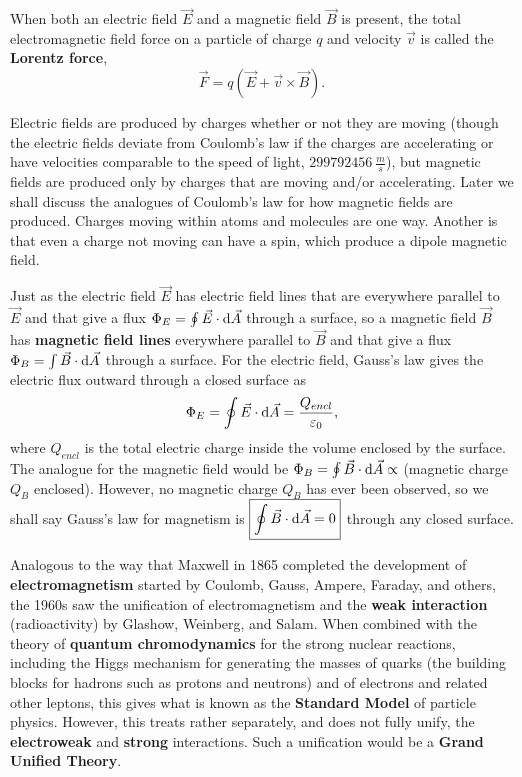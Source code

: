 When both an electric field $\vec{E}$ and a magnetic field $\vec{B}$ is present, the total electromagnetic field force on a particle of charge $q$ and velocity $\vec{v}$ is called the \textbf{Lorentz force},
\begin{equation}
\boxed{\vec{F} = q(\vec{E} + \vec{v} \times \vec{B})}.
\end{equation}

Electric fields are produced by charges whether or not they are moving (though the electric fields deviate from Coulomb's law if the charges are accelerating or have velocities comparable to the speed of light, $\SI{299792456}{\frac{m}{s}}$), but magnetic fields are produced only by charges that are moving and/or accelerating. Later we shall discuss the analogues of Coulomb's law for how magnetic fields are produced. Charges moving within atoms and molecules are one way. Another is that even a charge not moving can have a spin, which produce a dipole magnetic field.

Just as the electric field $\vec{E}$ has electric field lines that are everywhere parallel to $\vec{E}$ and that give a flux $\Phi_E = \oint \vec{E} \cdot \operatorname{d\!} \vec{A}$ through a surface, so a magnetic field $\vec{B}$ has \textbf{magnetic field lines} everywhere parallel to $\vec{B}$ and that give a flux $\Phi_B = \int \vec{B} \cdot \operatorname{d\!} \vec{A}$ through a surface. For the electric field, Gauss's law gives the electric flux outward through a closed surface as 
\begin{equation}
\Phi_E = \oint \vec{E} \cdot \operatorname{d\!} \vec{A} = \frac{Q_{encl}}{\varepsilon_0},
\end{equation}
where $Q_{encl}$ is the total electric charge inside the volume enclosed by the surface. The analogue for the magnetic field would be $\Phi_B = \oint \vec{B} \cdot \operatorname{d\!} \vec{A} \propto$ (magnetic charge $Q_B$ enclosed). However, no magnetic charge $Q_B$ has ever been observed, so we shall say Gauss's law for magnetism is $\boxed{\oint \vec{B} \cdot \operatorname{d\!} \vec{A} = 0}$ through any closed surface.

Analogous to the way that Maxwell in 1865 completed the development of \textbf{electromagnetism} started by Coulomb, Gauss, Ampere, Faraday, and others, the 1960s saw the unification of electromagnetism and the \textbf{weak interaction} (radioactivity) by Glashow, Weinberg, and Salam. When combined with the theory of \textbf{quantum chromodynamics} for the strong nuclear reactions, including the Higgs mechanism for generating the masses of quarks (the building blocks for hadrons such as protons and neutrons) and of electrons and related other leptons, this gives what is known as the \textbf{Standard Model} of particle physics. However, this treats rather separately, and does not fully unify, the \textbf{electroweak} and \textbf{strong} interactions. Such a unification would be a \textbf{Grand Unified Theory}.

